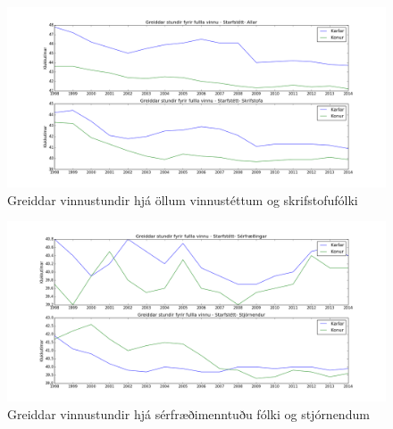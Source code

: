 \documentclass[12pt, svn, draft]{rureport}
\begin{document}
\begin{figure}
	\centering 
	\includegraphics[width=\textwidth]{../graphics/unnir_timar1.png}
	\caption{Greiddar vinnustundir hjá öllum vinnustéttum og skrifstofufólki \label{fig:unnirtimar1}}
\end{figure}

\begin{figure}
	\centering 
	\includegraphics[width=\textwidth]{../graphics/unnir_timar2.png}
	\caption{Greiddar vinnustundir hjá sérfræðimenntuðu fólki og stjórnendum \label{fig:unnirtimar2}}
\end{figure}

%
\printbibliography
\end{document}
